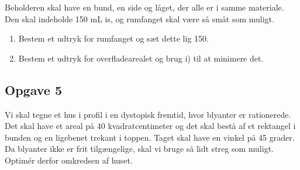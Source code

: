 Beholderen skal have en bund, en side og låget, der alle er i samme materiale. Den skal indeholde 150 mL is, og rumfanget skal være så småt som muligt. 

\begin{enumerate}[label=\roman*)]
	\item Bestem et udtryk for rumfanget og sæt dette lig 150.
	\item Bestem et udtryk for overfladearealet og brug i) til at minimere det. 
\end{enumerate}


\subsection*{Opgave 5}
Vi skal tegne et hus i profil i en dystopisk fremtid, hvor blyanter er rationerede. Det skal have et areal på 40 kvadratcentimeter og det skal bestå af et rektangel i bunden og en ligebenet trekant i toppen. Taget skal have en vinkel på 45 grader. Da blyanter ikke er frit tilgængelige, skal vi bruge så lidt streg som muligt. Optimér derfor omkredsen af huset. 


\newpage

